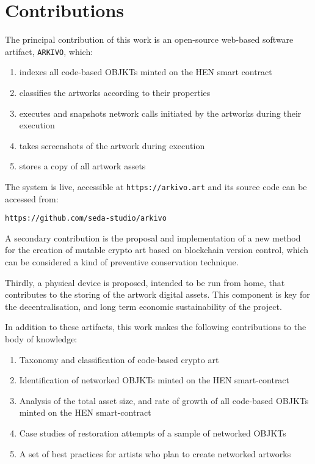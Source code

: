 \section{Contributions}

The principal contribution of this work is an open-source web-based software artifact, \texttt{ARKIVO}, which:

\begin{enumerate}
	\item indexes all code-based OBJKTs minted on the HEN smart contract
	\item classifies the artworks according to their properties
	\item executes and snapshots network calls initiated by the artworks during their execution
	\item takes screenshots of the artwork during execution
	\item stores a copy of all artwork assets
\end{enumerate}

\vspace{0.5cm}

The system is live, accessible at \texttt{https://arkivo.art} and its source code can be accessed from:

\texttt{https://github.com/seda-studio/arkivo}

\vspace{0.5cm}

A secondary contribution is the proposal and implementation of a new method for the creation of mutable crypto art based on blockchain version control, which can be considered a kind of preventive conservation technique.

Thirdly, a physical device is proposed, intended to be run from home, that contributes to the storing of the artwork digital assets. This component is key for the decentralisation, and long term economic sustainability of the project. 

\vspace{0.5cm}

In addition to these artifacts, this work makes the following contributions to the body of knowledge:

\begin{enumerate}
    \item Taxonomy and classification of code-based crypto art
    \item Identification of networked OBJKTs minted on the HEN smart-contract
    \item Analysis of the total asset size, and rate of growth of all code-based OBJKTs minted on the HEN smart-contract
    \item Case studies of restoration attempts of a sample of networked OBJKTs
    \item A set of best practices for artists who plan to create networked artworks
\end{enumerate}


